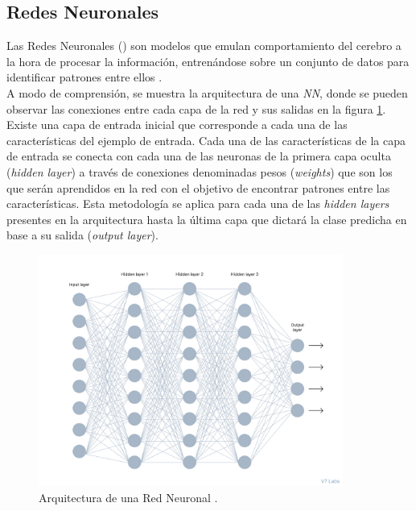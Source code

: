         \subsection {Redes Neuronales}

            Las Redes Neuronales () son modelos que emulan comportamiento del cerebro a la hora de procesar la información, entrenándose sobre un conjunto de datos para identificar patrones entre ellos \cite{NNReview}.\\

            A modo de comprensión, se muestra la arquitectura de una \textit{NN}, donde se pueden observar las conexiones entre cada capa de la red y sus salidas en la figura \ref{NNImage}. Existe una capa de entrada inicial que corresponde a cada una de las características del ejemplo de entrada. Cada una de las características de la capa de entrada se conecta con cada una de las neuronas de la primera capa oculta (\textit{hidden layer}) a través de conexiones denominadas pesos (\textit{weights}) que son los que serán aprendidos en la red con el objetivo de encontrar patrones entre las características. Esta metodología se aplica para cada una de las \textit{hidden layers} presentes en la arquitectura hasta la última capa que dictará la clase predicha en base a su salida (\textit{output layer}).\\

            \begin{figure}[h]
                \centering
                \includegraphics[width=10cm]{archivos/3.Tecnologias/RedesNeuronales/NNImage}
                \caption{Arquitectura de una Red Neuronal \cite{ReferenciaImagenNN}.}
                \label{NNImage}
             \end{figure}



